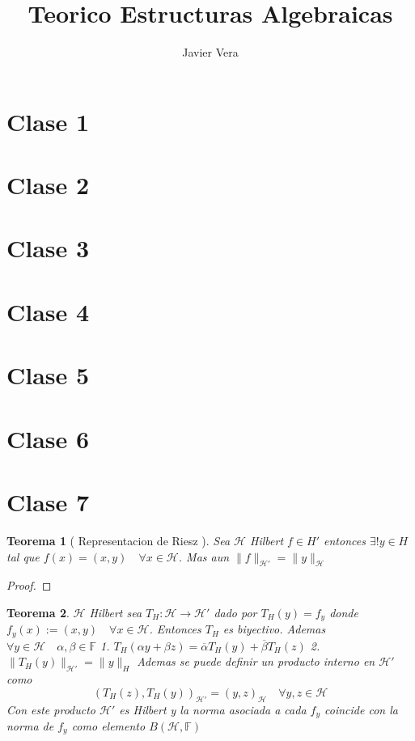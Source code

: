 \documentclass[10pt]{extarticle}
\theoremstyle{break}
\newtheorem{theorem}{Teorema}[section]
\theoremstyle{definition}
\begin{document}
\title{Teorico Estructuras Algebraicas}
\author{Javier Vera}
\maketitle

\section{Clase 1}
\section{Clase 2}
\section{Clase 3}
\section{Clase 4}
\section{Clase 5}
\section{Clase 6}
\section{Clase 7}

\begin{theorem}[ Representacion de Riesz ] \label{7.3}
Sea $\mathcal{H}$ Hilbert $f\in H'$ entonces $\exists !y\in H$ tal que $f(x)=(x,y)\quad\forall x\in \mathcal{H}$. Mas aun $\lVert f \rVert_{\mathcal{H}'}=\lVert y \rVert_{\mathcal{H}}$
\end{theorem}
\begin{proof}
	
\end{proof}

\begin{theorem} \label{7.4}
	$\mathcal{H}$ Hilbert sea $T_{H}:\mathcal{H}\rightarrow\mathcal{H'}$ dado por $T_{H}(y)=f_{y}$ donde $f_{y}(x):=(x,y)\quad\forall x\in \mathcal{H}$. Entonces $T_{H}$ es biyectivo. Ademas $\forall y\in \mathcal{H}\quad\alpha,\beta\in \mathbb{F}$
	1. $T_{H}(\alpha y + \beta z)=\overline{\alpha}T_{H}(y)+\overline{\beta}T_{H}(z)$
	2. $\lVert T_{H}(y) \rVert_{\mathcal{H}'}=\lVert y \rVert_{H}$
	Ademas se puede definir un producto interno en $\mathcal{H}'$ como 
	$$(T_{H}(z),T_{H}(y))_{\mathcal{H}'}=(y,z)_{\mathcal{H}}\quad \forall y,z\in \mathcal{H}$$
	Con este producto $\mathcal{H}'$ es Hilbert y la norma asociada a cada $f_{y}$ coincide con la norma de $f_{y}$ como elemento $B(\mathcal{H},\mathbb{F})$
\end{theorem}
\end{document}
